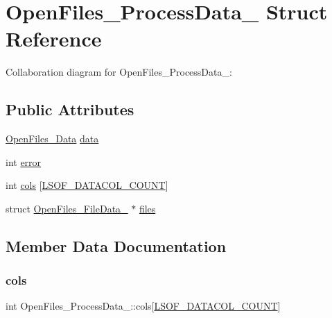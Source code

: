 \hypertarget{structOpenFiles__ProcessData__}{}\section{Open\+Files\+\_\+\+Process\+Data\+\_\+ Struct Reference}
\label{structOpenFiles__ProcessData__}


Collaboration diagram for Open\+Files\+\_\+\+Process\+Data\+\_\+\+:
\subsection*{Public Attributes}
\begin{DoxyCompactItemize}
\item 
\hyperlink{OpenFilesScreen_8c_a970c2a88b9b6bb8907ac74fc674a9880}{Open\+Files\+\_\+\+Data} \hyperlink{structOpenFiles__ProcessData___af9085e5f1095dcc9a0e6171a1c148b26}{data}
\item 
int \hyperlink{structOpenFiles__ProcessData___aff7c5c65490417dd0f508a646b0064b8}{error}
\item 
int \hyperlink{structOpenFiles__ProcessData___a7bb48d985c3e2cb8857248adb7f1f477}{cols} \mbox{[}\hyperlink{OpenFilesScreen_8c_a76c37d4941ca3892deded6425ffb056f}{L\+S\+O\+F\+\_\+\+D\+A\+T\+A\+C\+O\+L\+\_\+\+C\+O\+U\+NT}\mbox{]}
\item 
struct \hyperlink{structOpenFiles__FileData__}{Open\+Files\+\_\+\+File\+Data\+\_\+} $\ast$ \hyperlink{structOpenFiles__ProcessData___a2d694ea49cfacc2fbe8b109bc1d98339}{files}
\end{DoxyCompactItemize}


\subsection{Member Data Documentation}
\mbox{\label{structOpenFiles__ProcessData___a7bb48d985c3e2cb8857248adb7f1f477}} 
\subsubsection{\texorpdfstring{cols}{cols}}
{\footnotesize\ttfamily int Open\+Files\+\_\+\+Process\+Data\+\_\+\+::cols\mbox{[}\hyperlink{OpenFilesScreen_8c_a76c37d4941ca3892deded6425ffb056f}{L\+S\+O\+F\+\_\+\+D\+A\+T\+A\+C\+O\+L\+\_\+\+C\+O\+U\+NT}\mbox{]}}

